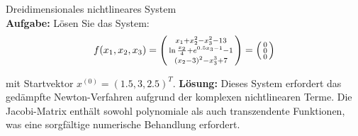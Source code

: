 \begin{example2}{Dreidimensionales nichtlineares System}\\
\textbf{Aufgabe:} Lösen Sie das System:
$$f(x_1, x_2, x_3) = \begin{psmallmatrix}
x_1 + x_2^2 - x_3^2 - 13 \\
\ln\frac{x_2}{4} + e^{0.5x_3-1} - 1 \\
(x_2 - 3)^2 - x_3^3 + 7
\end{psmallmatrix} = \begin{psmallmatrix} 0 \\ 0 \\ 0 \end{psmallmatrix}$$

mit Startvektor $x^{(0)} = (1.5, 3, 2.5)^T$.
\tcblower
\textbf{Lösung:}
Dieses System erfordert das gedämpfte Newton-Verfahren aufgrund der komplexen nichtlinearen Terme. Die Jacobi-Matrix enthält sowohl polynomiale als auch transzendente Funktionen, was eine sorgfältige numerische Behandlung erfordert.
\end{example2}

